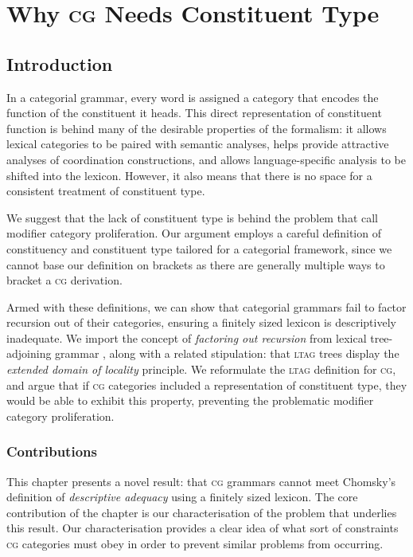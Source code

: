 \documentclass[11pt,twoside,final]{ahudson-harvard}
\newcommand{\ltag}{\textsc{ltag}\xspace}
\newcommand{\cg}{\textsc{cg}\xspace}
\newcommand{\term}[1]{\emph{#1}}
\begin{document}
\chapter{Why \cg Needs Constituent Type}

\section{Introduction}

In a categorial grammar, every word is assigned a category that encodes the function of the constituent it heads. This direct representation of constituent function is behind many of the desirable properties of the formalism: it allows lexical categories to be paired with semantic analyses, helps provide attractive analyses of coordination constructions, and allows language-specific analysis to be shifted into the lexicon. However, it also means that there is no space for a consistent treatment of constituent type.

We suggest that the lack of constituent type is behind the problem that \citet{hock:07} call modifier category proliferation.  Our argument employs a careful definition of constituency and constituent type tailored for a categorial framework, since we cannot base our definition on brackets as there are generally multiple ways to bracket a \cg derivation.

Armed with these definitions, we can show that categorial grammars fail to factor recursion out of their categories, ensuring a finitely sized lexicon is descriptively inadequate. We import the concept of \emph{factoring out recursion} from lexical tree-adjoining grammar \citet{ltag}, along with a related stipulation: that \ltag trees display the \emph{extended domain of locality} principle. We reformulate the \ltag definition for \cg, and argue that if \cg categories included a representation of constituent type, they would be able to exhibit this property, preventing the problematic modifier category proliferation.

\subsection{Contributions}

This chapter presents a novel result: that \cg grammars cannot meet Chomsky's definition of \term{descriptive adequacy} \citep{aspects_of_syntax} using a finitely sized lexicon. The core contribution of the chapter is our characterisation of the problem that underlies this result. Our characterisation provides a clear idea of what sort of constraints \cg categories must obey in order to prevent similar problems from occurring.
\end{document}
